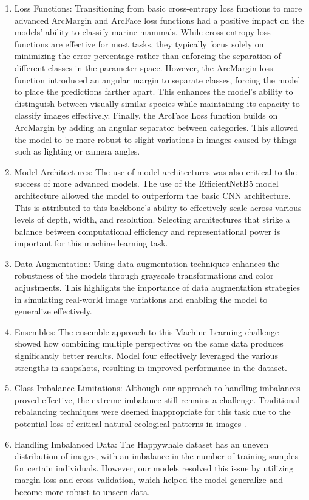 \documentclass[twocolumn]{article}
\begin{document}
\begin{enumerate}
    \item Loss Functions: Transitioning from basic cross-entropy loss functions to more advanced ArcMargin and ArcFace loss functions had a positive impact on the models' ability to classify marine mammals. While cross-entropy loss functions are effective for most tasks, they typically focus solely on minimizing the error percentage rather than enforcing the separation of different classes in the parameter space. However, the ArcMargin loss function introduced an angular margin to separate classes, forcing the model to place the predictions farther apart. This enhances the model's ability to distinguish between visually similar species while maintaining its capacity to classify images effectively. Finally, the ArcFace Loss function builds on ArcMargin by adding an angular separator between categories. This allowed the model to be more robust to slight variations in images caused by things such as lighting or camera angles. 
    \item Model Architectures: The use of model architectures was also critical to the success of more advanced models. The use of the EfficientNetB5 model architecture allowed the model to outperform the basic CNN architecture. This is attributed to this backbone's ability to effectively scale across various levels of depth, width, and resolution. Selecting architectures that strike a balance between computational efficiency and representational power is important for this machine learning task.
    \item Data Augmentation: Using data augmentation techniques enhances the robustness of the models through grayscale transformations and color adjustments. This highlights the importance of data augmentation strategies in simulating real-world image variations and enabling the model to generalize effectively. 
    \item Ensembles: The ensemble approach to this Machine Learning challenge showed how combining multiple perspectives on the same data produces significantly better results. Model four effectively leveraged the various strengths in snapshots, resulting in improved performance in the dataset.
    \item Class Imbalance Limitations: Although our approach to handling imbalances proved effective, the extreme imbalance still remains a challenge. Traditional rebalancing techniques were deemed inappropriate for this task due to the potential loss of critical natural ecological patterns in images . 
    \item Handling Imbalanced Data: The Happywhale dataset has an uneven distribution of images, with an imbalance in the number of training samples for certain individuals. However, our models resolved this issue by utilizing margin loss and cross-validation, which helped the model generalize and become more robust to unseen data.
\end{enumerate}
\end{document}
